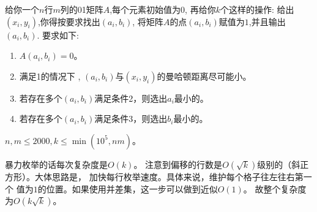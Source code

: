 \begin{prob}
	给你一个$n$行$m$列的01矩阵$A$,每个元素初始值为$0$,
	再给你$k$个这样的操作:
	给出$(x_i,y_i)$,你得按要求找出$(a_i,b_i)$,
	将矩阵$A$的点$(a_i,b_i)$赋值为$1$,并且输出$(a_i,b_i)$.
	要求如下:
	\begin{enumerate}
		\item $A(a_i,b_i)=0$。
		\item 满足1的情况下 , $(a_i,b_i)$与$(x_i,y_i)$的曼哈顿距离尽可能小。
		\item 若存在多个$(a_i,b_i)$满足条件2，则选出$a_i$最小的。
		\item 若存在多个$(a_i,b_i)$满足条件3，则选出$b_i$最小的。
	\end{enumerate}
	\par
	$n, m \le 2000, k \le \min(10^5, nm)$。
\end{prob}

\begin{sol}
	暴力枚举的话每次复杂度是$O(k)$。
	注意到偏移的行数是$O(\sqrt{k})$级别的（斜正方形）。大体思路是，
	加快每行枚举速度。具体来说，维护每个格子往左往右第一个
	值为$1$的位置。如果使用并差集，这一步可以做到近似$O(1)$。
	故整个复杂度为$O(k \sqrt{k})$。
\end{sol}

